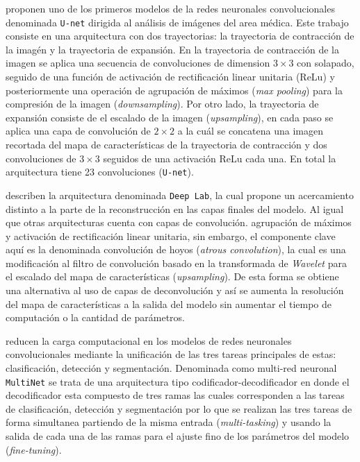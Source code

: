 \citet{DBLP:journals/corr/RonnebergerFB15} proponen uno de los primeros modelos de la redes neuronales convolucionales denominada \texttt{U-net} dirigida al análisis de imágenes del area médica. Este trabajo consiste en una arquitectura con dos trayectorias: la trayectoria de contracción de la imagén y la trayectoria de expansión. En la trayectoria de contracción de la imagen se aplica una secuencia de convoluciones de dimension $3 \times 3$ con solapado, seguido de una función de activación de rectificación linear unitaria (ReLu) y posteriormente una operación de agrupación de máximos (\emph{max pooling}) para la compresión de la imagen (\emph{downsampling}). Por otro lado, la trayectoria de expansión consiste de el escalado de la imagen (\emph{upsampling}), en cada paso se aplica una capa de convolución de $2 \times 2$ a la cuál se concatena una imagen recortada del mapa de características de la trayectoria de contracción y dos convoluciones de $3 \times 3$ seguidos de una activación ReLu cada una. En total la arquitectura tiene 23 convoluciones (\texttt{U-net}).

\citet{DBLP:journals/corr/ChenPK0Y16} describen la arquitectura denominada \texttt{Deep Lab}, la cual propone un acercamiento distinto a la parte de la reconstrucción en las capas finales del modelo. Al igual que otras arquitecturas cuenta con capas de convolución. agrupación de máximos y activación de rectificación linear unitaria, sin embargo, el componente clave aquí es la denominada convolución de hoyos (\emph{atrous convolution}), la cual es una modificación al filtro de convolución basado en la transformada de \emph{Wavelet} para el escalado del mapa de características (\emph{upsampling}). De esta forma se obtiene una alternativa al uso de capas de deconvolución y así se aumenta la resolución del mapa de características a la salida del modelo sin aumentar el tiempo de computación o la cantidad de parámetros.

\citet{DBLP:journals/corr/TeichmannWZCU16} reducen la carga computacional en los modelos de redes neuronales convolucionales mediante la unificación de las tres tareas principales de estas: clasificación, detección y segmentación. Denominada como multi-red neuronal \texttt{MultiNet} se trata de una arquitectura tipo codificador-decodificador en donde el decodificador esta compuesto de tres ramas las cuales corresponden a las tareas de clasificación, detección y segmentación por lo que se realizan las tres tareas de forma simultanea partiendo de la misma entrada (\emph{multi-tasking}) y usando la salida de cada una de las ramas para el ajuste fino de los parámetros del modelo (\emph{fine-tuning}).  


